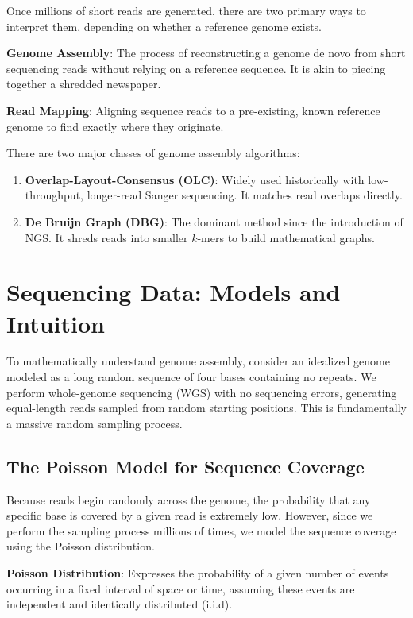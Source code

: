 \documentclass[11pt,a4paper]{article}
\newenvironment{important}{
    \vspace{1em}
    \begin{tcolorbox}[colback=blue!5!white, colframe=blue!75!black, boxrule=1pt, arc=4pt, left=10pt, right=10pt, top=10pt, bottom=10pt]
}{
    \end{tcolorbox}
    \vspace{1em}
}
\begin{document}
Once millions of short reads are generated, there are two primary ways to interpret them, depending on whether a reference genome exists.

\begin{important}
\textbf{Genome Assembly}: The process of reconstructing a genome de novo from short sequencing reads without relying on a reference sequence. It is akin to piecing together a shredded newspaper.

\textbf{Read Mapping}: Aligning sequence reads to a pre-existing, known reference genome to find exactly where they originate.
\end{important}

There are two major classes of genome assembly algorithms:
\begin{enumerate}
    \item \textbf{Overlap-Layout-Consensus (OLC)}: Widely used historically with low-throughput, longer-read Sanger sequencing. It matches read overlaps directly.
    \item \textbf{De Bruijn Graph (DBG)}: The dominant method since the introduction of NGS. It shreds reads into smaller $k$-mers to build mathematical graphs.
\end{enumerate}

\section{Sequencing Data: Models and Intuition}

To mathematically understand genome assembly, consider an idealized genome modeled as a long random sequence of four bases containing no repeats. We perform whole-genome sequencing (WGS) with no sequencing errors, generating equal-length reads sampled from random starting positions. This is fundamentally a massive random sampling process.

\subsection{The Poisson Model for Sequence Coverage}

Because reads begin randomly across the genome, the probability that any specific base is covered by a given read is extremely low. However, since we perform the sampling process millions of times, we model the sequence coverage using the Poisson distribution.

\begin{important}
\textbf{Poisson Distribution}: Expresses the probability of a given number of events occurring in a fixed interval of space or time, assuming these events are independent and identically distributed (i.i.d).
\end{important}
\end{document}
